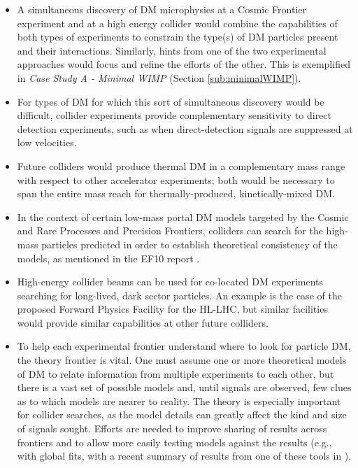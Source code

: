 \documentclass[nofootinbib]{article}
\begin{document}
\vspace{1em}
\begin{itemize}

\item A simultaneous discovery of DM microphysics at a Cosmic Frontier experiment and at a high energy collider would combine the capabilities of both types of experiments to constrain the type(s) of DM particles present and their interactions. Similarly, hints from one of the two experimental approaches would focus and refine the efforts of the other. This is exemplified in \textit{Case Study A - Minimal WIMP} (Section \ref{sub:minimalWIMP}). 

\item For types of DM for which this sort of simultaneous discovery would be difficult, collider experiments provide complementary sensitivity to direct detection experiments, such as when direct-detection signals are suppressed at low velocities. 

\item Future colliders would produce thermal DM in a complementary mass range with respect to other accelerator experiments; both would be necessary to span the entire mass reach for thermally-produced, kinetically-mixed DM. 

\item In the context of certain low-mass portal DM models targeted by the Cosmic and Rare Processes and Precision Frontiers, colliders can search for the high-mass particles predicted in order to establish theoretical consistency of the models, as mentioned in the EF10 report \cite{Bose:2022obr}. 

\item High-energy collider beams can be used for co-located DM experiments searching for long-lived, dark sector particles. An example is the case of the proposed Forward Physics Facility \cite{Feng:2022inv,Anchordoqui:2021ghd,Batell:2021blf} for the HL-LHC, but similar facilities would provide similar capabilities at other future colliders. 

\item To help each experimental frontier understand where to look for particle DM, the theory frontier is vital. One must assume one or more theoretical models of DM to relate information from multiple experiments to each other, but there is a vast set of possible models and, until signals are observed, few clues as to which models are nearer to reality. The theory is especially important for collider searches, as the model details can greatly affect the kind and size of signals sought. 
Efforts are needed to improve sharing of results across frontiers and to allow more easily testing models against the results (e.g., with global fits, with a recent summary of results from one of these tools in \cite{White:2022dsq}).
\end{itemize}
\end{document}
